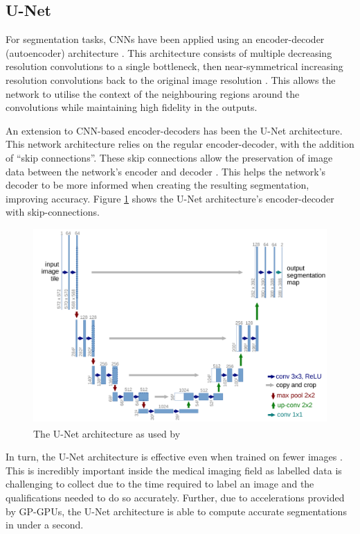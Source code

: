 \documentclass{l4proj}
\begin{document}
\subsection{U-Net}

For segmentation tasks, CNNs have been applied using an encoder-decoder (autoencoder) architecture \citep{zhou2019high}. This architecture consists of multiple decreasing resolution convolutions to a single bottleneck, then near-symmetrical increasing resolution convolutions back to the original image resolution \citep{badrinarayanan2017segnet}. This allows the network to utilise the context of the neighbouring regions around the convolutions while maintaining high fidelity in the outputs.

An extension to CNN-based encoder-decoders has been the U-Net architecture. This network architecture relies on the regular encoder-decoder, with the addition of “skip connections”. These skip connections allow the preservation of image data between the network’s encoder and decoder \citep{ronneberger2015unet}. This helps the network’s decoder to be more informed when creating the resulting segmentation, improving accuracy. Figure \ref{fig:unet} shows the U-Net architecture’s encoder-decoder with skip-connections.

\begin{figure}[htb]
    \centering
    \includegraphics[width=0.5\linewidth]{images/unet_architecture.png}  

    \caption{The U-Net architecture as used by \cite{ronneberger2015unet}}

    \label{fig:unet} 
\end{figure}

In turn, the U-Net architecture is effective even when trained on fewer images \citep{ronneberger2015unet}. This is incredibly important inside the medical imaging field as labelled data is challenging to collect due to the time required to label an image and the qualifications needed to do so accurately. Further, due to accelerations provided by GP-GPUs, the U-Net architecture is able to compute accurate segmentations in under a second.
\end{document}
